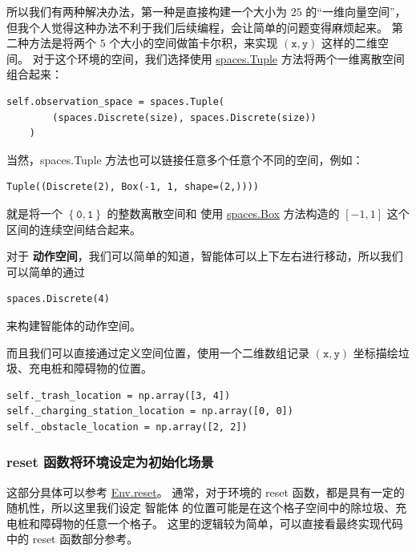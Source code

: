\documentclass[citestyle=gb7714-2015, bibstyle=gb7714-2015,lang=cn,14pt,scheme=chinese]{elegantbook}
\begin{document}
所以我们有两种解决办法，第一种是直接构建一个大小为 \(25\) 的“一维向量空间”，但我个人觉得这种办法不利于我们后续编程，会让简单的问题变得麻烦起来。
第二种方法是将两个 \(5\) 个大小的空间做笛卡尔积，来实现 \(\left(\texttt{x}, \texttt{y}\right)\) 这样的二维空间。
对于这个环境的空间，我们选择使用 \href{https://gymnasium.farama.org/api/spaces/composite/#gymnasium.spaces.Tuple}{\textsf{spaces.Tuple}} 方法将两个一维离散空间组合起来：
\begin{verbatim}
self.observation_space = spaces.Tuple(
        (spaces.Discrete(size), spaces.Discrete(size))
    )
\end{verbatim}
当然，{\textsf{spaces.Tuple}} 方法也可以链接任意多个任意个不同的空间，例如：
\begin{verbatim}
Tuple((Discrete(2), Box(-1, 1, shape=(2,))))
\end{verbatim}
就是将一个 \(\left\{ \mathtt{0}, \mathtt{1} \right\}\) 的整数离散空间和 使用 \href{https://gymnasium.farama.org/api/spaces/fundamental/#gymnasium.spaces.Box}{\textsf{spaces.Box}} 方法构造的 \(\left[ -1, 1 \right]\) 这个区间的连续空间结合起来。

对于 \textbf{动作空间}，我们可以简单的知道，智能体可以上下左右进行移动，所以我们可以简单的通过 
\begin{verbatim}
spaces.Discrete(4)
\end{verbatim}
来构建智能体的动作空间。

而且我们可以直接通过定义空间位置，使用一个二维数组记录 \(\left( \texttt{x}, \texttt{y} \right)\) 坐标描绘垃圾、充电桩和障碍物的位置。
\begin{verbatim}
self._trash_location = np.array([3, 4])
self._charging_station_location = np.array([0, 0])
self._obstacle_location = np.array([2, 2])
\end{verbatim}

\subsubsection{\textsf{reset} 函数将环境设定为初始化场景}

这部分具体可以参考 \href{https://gymnasium.farama.org/api/env/#gymnasium.Env.reset}{\textsf{Env.reset}}。
通常，对于环境的 \textsf{reset} 函数，都是具有一定的随机性，所以这里我们设定 智能体 的位置可能是在这个格子空间中的除垃圾、充电桩和障碍物的任意一个格子。
这里的逻辑较为简单，可以直接看最终实现代码中的 \textsf{reset} 函数部分参考。
\end{document}
